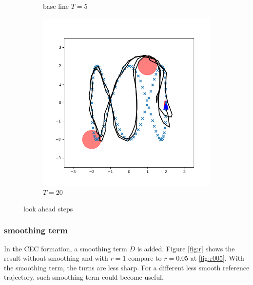\documentclass[conference]{IEEEtran}
\begin{document}
\begin{figure}[h]
\begin{subfigure}[b]{0.3\textwidth}
        \caption{base line $T=5$}
        \label{fig:T5}
    \end{subfigure}
    \hfill
    \begin{subfigure}[b]{0.3\textwidth}
        \includegraphics[width=\textwidth]{../fig/trajectory.cec.T_20_0.1.png}
        \caption{$T=20$}
        \label{fig:T20}
    \end{subfigure}
    \caption{look ahead steps}
    \label{fig:Ts}
\end{figure}

\subsubsection{smoothing term}
In the CEC formation, a smoothing term $D$ is added.
Figure \ref{fig:r} shows the result without smoothing and with $r=1$ compare to $r=0.05$ at \ref{fig:r005}.
With the smoothing term, the turns are less sharp.
For a different less smooth reference trajectory, such smoothing term could become useful.
\end{document}
